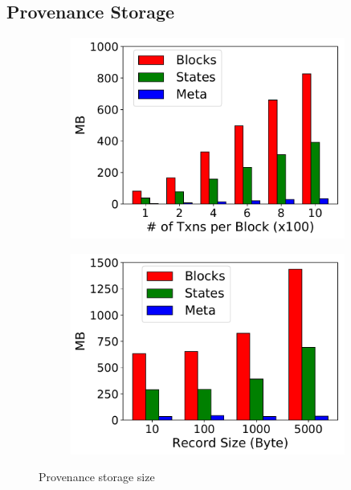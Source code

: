 \subsection{Provenance Storage}
\begin{figure}[tp]
	\centering
    \begin{subfigure}{0.45\textwidth}
      \includegraphics[width=0.99\textwidth]{chart/provenance/ycsb_blksize_storage.pdf}
      \caption{}
      \label{chart:provenance:ycsb_blksize_storage}
    \end{subfigure}
    \begin{subfigure}{0.45\textwidth}
      \includegraphics[width=0.99\textwidth]{chart/provenance/ycsb_recordsize_storage.pdf}
      \caption{}
      \label{chart:provenance:ycsb_recordsize_storage}
    \end{subfigure}
    \caption{Provenance storage size}
\end{figure}
